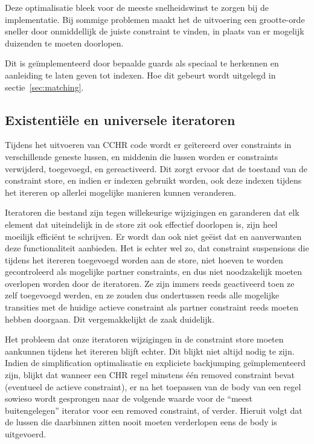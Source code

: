 Deze optimalisatie bleek voor de meeste snelheidswinst te zorgen bij de implementatie. Bij sommige problemen maakt het de uitvoering een grootte-orde sneller door onmiddellijk de juiste constraint te vinden, in plaats van er mogelijk duizenden te moeten doorlopen.

Dit is ge\"implementeerd door bepaalde guards als speciaal te herkennen en aanleiding te laten geven tot indexen. Hoe dit gebeurt wordt uitgelegd in sectie~\ref{sec:matching}.
 
\subsection{Existenti\"ele en universele iteratoren} \label{sec:gencode-iter}

Tijdens het uitvoeren van CCHR code wordt er ge\"itereerd over constraints in verschillende geneste lussen, en middenin die lussen worden er constraints verwijderd, toegevoegd, en gereactiveerd. Dit zorgt ervoor dat de toestand van de constraint store, en indien er indexen gebruikt worden, ook deze indexen tijdens het itereren op allerlei mogelijke manieren kunnen veranderen.

Iteratoren die bestand zijn tegen willekeurige wijzigingen en garanderen dat elk element dat uiteindelijk in de store zit ook effectief doorlopen is, zijn heel moeilijk effici\"ent te schrijven. Er wordt dan ook niet ge\"eist dat  en aanverwanten deze functionaliteit aanbieden. Het is echter wel zo, dat constraint suspensions die tijdens het itereren toegevoegd worden aan de store, niet hoeven te worden gecontroleerd als mogelijke partner constraints, en dus niet noodzakelijk moeten overlopen worden door de iteratoren. Ze zijn immers reeds geactiveerd toen ze zelf toegevoegd werden, en ze zouden dus ondertussen reeds alle mogelijke transities met de huidige actieve constraint als partner constraint reeds moeten hebben doorgaan. Dit vergemakkelijkt de zaak duidelijk.

Het probleem dat onze iteratoren wijzigingen in de constraint store moeten aankunnen tijdens het itereren blijft echter. Dit blijkt niet altijd nodig te zijn. Indien de simplification optimalisatie en expliciete backjumping ge\"implementeerd zijn, blijkt dat wanneer een CHR regel minstens \'e\'en removed constraint bevat (eventueel de actieve constraint), er na het toepassen van de body van een regel sowieso wordt gesprongen naar de volgende waarde voor de ``meest buitengelegen'' iterator voor een removed constraint, of verder. Hieruit volgt dat de lussen die daarbinnen zitten nooit moeten verderlopen eens de body is uitgevoerd.

